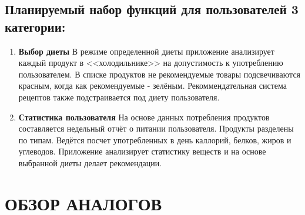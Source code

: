 \documentclass[14pt]{extreport}
\begin{document}
\section {Планируемый набор функций для пользователей 3 категории: }
\begin{enumerate}
    \item \textbf{Выбор диеты} 
    \newline
    В режиме определенной диеты приложение анализирует каждый продукт в <<холодильнике>> на допустимость к употреблению пользователем. В списке продуктов не рекомендуемые товары подсвечиваются красным, когда как рекомендуемые - зелёным. Рекоммендательная система рецептов также подстраивается под диету пользователя.
    \item \textbf{Статистика пользователя}
    \newline
    На основе данных потребления продуктов составляется недельный отчёт о питании пользователя. Продукты разделены по типам. Ведётся посчет употребленных в день каллорий, белков, жиров и углеводов. Приложение анализирует статистику веществ и на основе выбранной диеты делает рекомендации.
\end{enumerate}
\newpage
\chapter{ОБЗОР АНАЛОГОВ}
\end{document}
